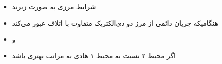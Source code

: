 \begin{ELjoin}

\begin{itemize}
\tightlist
\item
  شرایط مرزی به صورت زیرند
\end{itemize}

\begin{ELimportant}{}


\end{ELimportant}

\end{ELjoin}

\begin{ELunit}

\begin{itemize}
\tightlist
\item
  هنگامیکه جریان دائمی از مرز دو دی‌الکتریک متفاوت با اتلاف عبور می‌کند
\end{itemize}


\begin{itemize}
\tightlist
\item
   و 
\item
  اگر محیط ۲ نسبت به محیط ۱ هادی به مراتب بهتری باشد
\end{itemize}


\end{ELunit}

